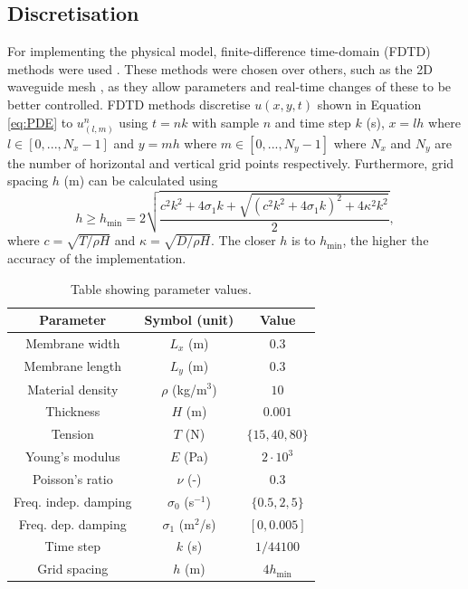     \subsection{Discretisation}
    For implementing the physical model, finite-difference time-domain (FDTD) methods were used \cite{bilbao2009numerical}. These methods were chosen over others, such as the 2D waveguide mesh \cite{Duyne1993}, as they allow parameters and real-time changes of these to be better controlled. FDTD methods discretise $u(x,y,t)$ shown in Equation \eqref{eq:PDE} to $u_{(l,m)}^n$ using $t = nk$ with sample $n$ and time step $k$ (s), $x=lh$ where $l \in [0, ..., N_x-1]$ and $y=mh$ where $m \in [0, ..., N_y-1]$ where $N_x$ and $N_y$ are the number of horizontal and vertical grid points respectively. Furthermore, grid spacing $h$ (m) can be calculated using 
    \begin{equation}\label{eq:h}
        h \geq h_\text{min} =  2\sqrt{\frac{c^2k^2 + 4\sigma_1k + \sqrt{(c^2k^2 + 4\sigma_1k)^2 + 4\kappa^2 k^2} }{2}},
    \end{equation}
    where $c = \sqrt{T/\rho H}$ and $\kappa = \sqrt{D/\rho H}$. The closer $h$ is to $h_\text{min}$, the higher the accuracy of the implementation.
    
    \begin{table}[t]
    \centering
    \begin{tabular}{|c|c|c|}
        \hline
        Parameter & Symbol (unit) & Value \\
        \hline
        Membrane width & $L_x$ (m) & $0.3$\\
        Membrane length & $L_y$ (m) & $0.3$ \\
        Material density & $\rho$ (kg/m$^3$)& $10$ \\
        Thickness & $H$ (m) & $0.001$ \\
        Tension & $T$ (N) & $\{15, 40, 80\}$ \\
        Young's modulus & $E$ (Pa)& $2\cdot 10^3$ \\
        Poisson's ratio & $\nu$ (-)& $0.3$ \\
        Freq. indep. damping & $\sigma_0$ (s$^{-1}$) & $\{0.5, 2, 5\}$\\
        Freq. dep. damping & $\sigma_1$ (m$^2$/s) & $[0, 0.005]$\\
        Time step & $k$ (s) & $1/44100$\\
        Grid spacing & $h$ (m) & $4h_\text{min}$\\
        \hline
    \end{tabular}
    \caption{Table showing parameter values.}\label{tab:parameters}
    \end{table}
    
